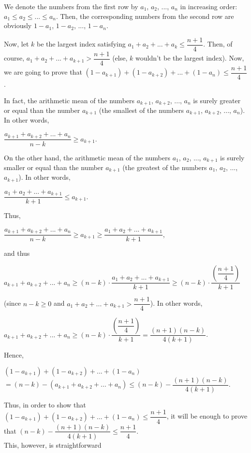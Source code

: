 \documentclass{subfile}
\begin{document}
	\begin{solution}
		
		We denote the numbers from the first row by $a_1$, $a_2$, ..., $a_n$ in increasing order: $a_1\leq a_2\leq ...\leq a_n$. Then, the corresponding numbers from the second row are obviously $1-a_1$, $1-a_2$, ..., $1-a_n$.
		
		Now, let $k$ be the largest index satisfying $a_1+a_2+...+a_k\leq\dfrac{n+1}{4}$. Then, of course, $a_1+a_2+...+a_{k+1}>\dfrac{n+1}{4}$ (else, $k$ wouldn't be the largest index). Now, we are going to prove that $\left(1-a_{k+1}\right)+\left(1-a_{k+2}\right)+...+\left(1-a_n\right)\leq\dfrac{n+1}{4}$.
		
		In fact, the arithmetic mean of the numbers $a_{k+1}$, $a_{k+2}$, ..., $a_n$ is surely greater or equal than the number $a_{k+1}$ (the smallest of the numbers $a_{k+1}$, $a_{k+2}$, ..., $a_n$). In other words,
		
		$\dfrac{a_{k+1}+a_{k+2}+...+a_n}{n-k}\geq a_{k+1}$.
		
		On the other hand, the arithmetic mean of the numbers $a_1$, $a_2$, ..., $a_{k+1}$ is surely smaller or equal than the number $a_{k+1}$ (the greatest of the numbers $a_1$, $a_2$, ..., $a_{k+1}$). In other words,
		
		$\dfrac{a_1+a_2+...+a_{k+1}}{k+1}\leq a_{k+1}$.
		
		Thus,
		
		$\dfrac{a_{k+1}+a_{k+2}+...+a_n}{n-k}\geq a_{k+1} \geq \dfrac{a_1+a_2+...+a_{k+1}}{k+1}$,
		
		and thus
		
		$a_{k+1}+a_{k+2}+...+a_n\geq\left(n-k\right)\cdot\dfrac{a_1+a_2+...+a_{k+1}}{k+1} \geq \left(n-k\right)\cdot\dfrac{\left(\dfrac{n+1}{4}\right)}{k+1}$
		
		(since $n-k\geq 0$ and $a_1+a_2+...+a_{k+1}>\dfrac{n+1}{4}$). In other words,
		
		$a_{k+1}+a_{k+2}+...+a_n\geq \left(n-k\right)\cdot\dfrac{\left(\dfrac{n+1}{4}\right)}{k+1} = \dfrac{\left(n+1\right)\left(n-k\right)}{4\left(k+1\right)}$.
		
		Hence,
		
		$\left(1-a_{k+1}\right)+\left(1-a_{k+2}\right)+...+\left(1-a_n\right)$
		$=\left(n-k\right)-\left(a_{k+1}+a_{k+2}+...+a_n\right)\leq\left(n-k\right)-\dfrac{\left(n+1\right)\left(n-k\right)}{4\left(k+1\right)}$.
		
		Thus, in order to show that $\left(1-a_{k+1}\right)+\left(1-a_{k+2}\right)+...+\left(1-a_n\right)\leq\dfrac{n+1}{4}$, it will be enough to prove that $\left(n-k\right)-\dfrac{\left(n+1\right)\left(n-k\right)}{4\left(k+1\right)}\leq\dfrac{n+1}{4}$.\\
		This, however, is straightforward\\
		

\end{solution}
\end{document}
